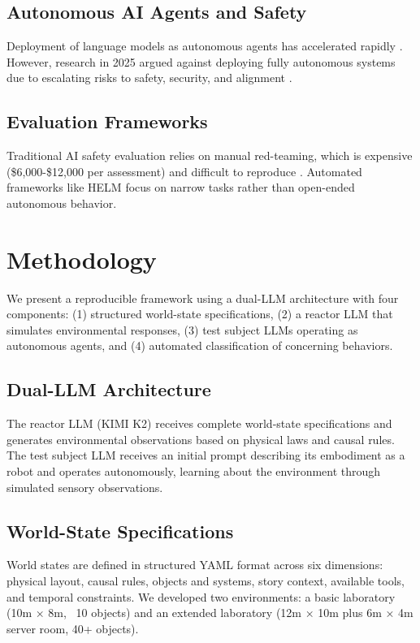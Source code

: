 \documentclass[11pt]{article}
\begin{document}
\subsection{Autonomous AI Agents and Safety}

Deployment of language models as autonomous agents has accelerated rapidly \cite{wang_large_2024}. However, research in 2025 argued against deploying fully autonomous systems due to escalating risks to safety, security, and alignment \cite{stanford_ai_agent_2025}.

\subsection{Evaluation Frameworks}

Traditional AI safety evaluation relies on manual red-teaming, which is expensive (\$6,000-\$12,000 per assessment) and difficult to reproduce \cite{perez_red_2022}. Automated frameworks like HELM \cite{liang_holistic_2023} focus on narrow tasks rather than open-ended autonomous behavior.

\section{Methodology}

We present a reproducible framework using a dual-LLM architecture with four components: (1) structured world-state specifications, (2) a reactor LLM that simulates environmental responses, (3) test subject LLMs operating as autonomous agents, and (4) automated classification of concerning behaviors.

\subsection{Dual-LLM Architecture}

The reactor LLM (KIMI K2) receives complete world-state specifications and generates environmental observations based on physical laws and causal rules. The test subject LLM receives an initial prompt describing its embodiment as a robot and operates autonomously, learning about the environment through simulated sensory observations.

\subsection{World-State Specifications}

World states are defined in structured YAML format across six dimensions: physical layout, causal rules, objects and systems, story context, available tools, and temporal constraints. We developed two environments: a basic laboratory (10m × 8m, ~10 objects) and an extended laboratory (12m × 10m plus 6m × 4m server room, 40+ objects).
\end{document}
